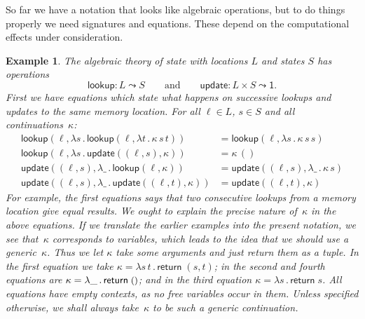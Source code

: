 \documentclass{amsart}
\newcommand{\lam}[1]{\lambda #1 \,.\,}
\newcommand{\leaf}[1]{\return{#1}} %
\newcommand{\opdecl}[3]{#1 : #2 \leadsto #3} %
\newcommand{\one}{\mathsf{1}} %
\newcommand{\unit}{{\text{\small$()$}}} %
\newcommand{\kode}[1]{\mathsf{#1}}
\newcommand{\opcall}[3]{\kode{#1}(#2, #3)}
\newcommand{\return}[1]{\kode{return}\;#1}
\newtheorem{example}{Example}[section]
\begin{document}
So far we have a notation that looks like algebraic operations, but to do things
properly we need signatures and equations. These depend on the computational
effects under consideration.

\begin{example}
  \label{ex:theory-state}
  The algebraic theory of \emph{state} with \emph{locations $L$} and
  \emph{states $S$} has operations
  \begin{equation*}
    \opdecl{\kode{lookup}}{L}{S}
    \qquad\text{and}\qquad
    \opdecl{\kode{update}}{L \times S}{\one}.
  \end{equation*}
  First we have equations which state what happens on successive lookups and
  updates to the same memory location. For all $\ell \in L$, $s \in S$ and
  all continuations~$\kappa$:
  \begin{align*}
    \opcall{lookup}{\ell}{
      \lam{s}{
        \opcall{lookup}{\ell}{
        \lam{t} \kappa \, s \, t}
      }
    } &=
    \opcall{lookup}{\ell}{\lam{s}{\kappa \, s \, s}}
    \\
    \opcall{lookup}{\ell}{
      \lam{s} \opcall{update}{(\ell, s)}{\kappa}
    } &=
    \kappa \, ()
    \\
    \opcall{update}{(\ell, s)}{
      \lam{\_} \opcall{lookup}{\ell}{\kappa}
    } &=
    \opcall{update}{(\ell, s)}{\lam{\_} \kappa \, s}
    \\
    \opcall{update}{(\ell, s)}{
      \lam{\_} \opcall{update}{(\ell, t)}{\kappa}
    } &=
    \opcall{update}{(\ell, t)}{\kappa}
  \end{align*}
  For example, the first equations says that two consecutive lookups from a
  memory location give equal results. We ought to explain the precise nature
  of~$\kappa$ in the above equations. If we translate the earlier examples into
  the present notation, we see that~$\kappa$ corresponds to variables, which
  leads to the idea that we should use a \emph{generic}~$\kappa$. Thus we let
  $\kappa$ take some arguments and just return them as a tuple. In the first
  equation we take $\kappa = \lam{s \, t } \leaf {(s, t)}$; in the second and
  fourth equations are $\kappa = \lam{\_} \leaf{\unit}$; and in the third
  equation $\kappa = \lam{s} \leaf{s}$. All equations have empty contexts, as no
  free variables occur in them. Unless specified otherwise, we shall
  always take~$\kappa$ to be such a generic continuation.


\end{example}
\end{document}
